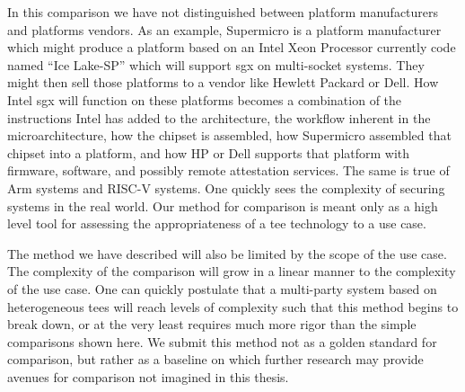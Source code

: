 In this comparison we have not distinguished between platform manufacturers and platforms vendors. As an example, Supermicro is a platform manufacturer which might produce a platform based on an Intel Xeon Processor currently code named ``Ice Lake-SP'' which will support \gls{sgx} on multi-socket systems. They might then sell those platforms to a vendor like Hewlett Packard or Dell. How Intel \gls{sgx} will function on these platforms becomes a combination of the instructions Intel has added to the architecture, the workflow inherent in the microarchitecture, how the chipset is assembled, how Supermicro assembled that chipset into a platform, and how HP or Dell supports that platform with firmware, software, and possibly remote \gls{attestation} services. The same is true of Arm systems and RISC-V systems. One quickly sees the complexity of securing systems in the real world. Our method for comparison is meant only as a high level tool for assessing the appropriateness of a \gls{tee} technology to a use case.

The method we have described will also be limited by the scope of the use case. The complexity of the comparison will grow in a linear manner to the complexity of the use case. One can quickly postulate that a multi-party system based on heterogeneous \glspl{tee} will reach levels of complexity such that this method begins to break down, or at the very least requires much more rigor than the simple comparisons shown here. We submit this method not as a golden standard for comparison, but rather as a baseline on which further research may provide avenues for comparison not imagined in this thesis.